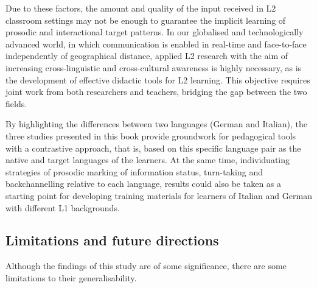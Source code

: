 \begin{stylecaption}
\textup{Due to these factors, the amount and quality of the input received in L2 classroom settings may not be enough to guarantee the implicit learning of prosodic and interactional target patterns. In our globalised and technologically advanced world, in which communication is enabled in real-time and face-to-face independently of geographical distance, applied L2 research with the aim of increasing cross-linguistic and cross-cultural awareness is highly necessary, as is the development of effective didactic tools for L2 learning. This objective requires joint work from both researchers and teachers, bridging the gap between the two fields.}
\end{stylecaption}

\begin{stylecaption}
\textup{By highlighting the differences between two languages (German and Italian), the three studies presented in this book provide groundwork for pedagogical tools with a contrastive approach, that is, based on this specific language pair as the native and target languages of the learners. At the same time, individuating strategies of prosodic marking of information status, turn-taking and backchannelling relative to each language, results could also be taken as a starting point for developing training materials for learners of Italian and German with different L1 backgrounds.}
\end{stylecaption}

\subsection{Limitations and future directions}
\hypertarget{Toc191305966}{}\begin{stylecaption}
\textup{Although the findings of this study are of some significance, there are some limitations to their generalisability.}
\end{stylecaption}

